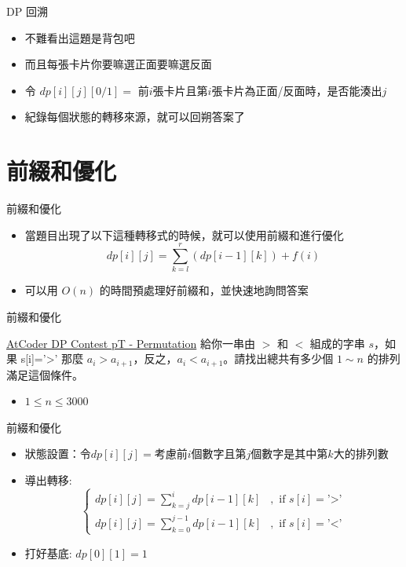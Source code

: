 \documentclass[aspectratio=169]{beamer}
\begin{document}
    \begin{frame}{DP 回溯}
        \begin{itemize}
            \item 不難看出這題是背包吧
            \item 而且每張卡片你要嘛選正面要嘛選反面
            \item<2-> 令 $dp[i][j][0/1] = $ 前$i$張卡片且第$i$張卡片為正面/反面時，是否能湊出$j$
            \item<3-> 紀錄每個狀態的轉移來源，就可以回朔答案了
        \end{itemize}
    \end{frame}

    \section{前綴和優化}

    \begin{frame}{前綴和優化}
        \begin{itemize}
            \item 當題目出現了以下這種轉移式的時候，就可以使用前綴和進行優化
            $$dp[i][j] = \sum_{k=l}^r (dp[i-1][k]) + f(i)$$
            \item 可以用 $O(n)$ 的時間預處理好前綴和，並快速地詢問答案
        \end{itemize}
    \end{frame}

    \begin{frame}{前綴和優化}
        \begin{block}{\href{https://atcoder.jp/contests/dp/tasks/dp_t}{AtCoder DP Contest pT - Permutation}}
            給你一串由 $>$ 和 $<$ 組成的字串 $s$，如果 s[i]='>' 那麼 $a_i > a_{i+1}$，反之，$a_i < a_{i+1}$。請找出總共有多少個 $1 \sim n$ 的排列滿足這個條件。 
            \begin{itemize}
                \item $1 \le n \le 3000$
            \end{itemize}
        \end{block} 
    \end{frame}
    
    \begin{frame}{前綴和優化}
        \begin{itemize}
            \item 狀態設置：令$dp[i][j] = $考慮前$i$個數字且第$j$個數字是其中第$k$大的排列數
            \item<2-> 導出轉移:
                $$\begin{cases} dp[i][j]=\sum_{k=j}^{i} dp[i-1][k] &, \text{ if } s[i] = \texttt{'>'}\\ 
                                dp[i][j]=\sum_{k=0}^{j-1} dp[i-1][k] &, \text { if } s[i] = \texttt{'<'} 
                  \end{cases}$$
            \item<3-> 打好基底: $dp[0][1] = 1$
        \end{itemize}
    \end{frame}
    
\end{document}
